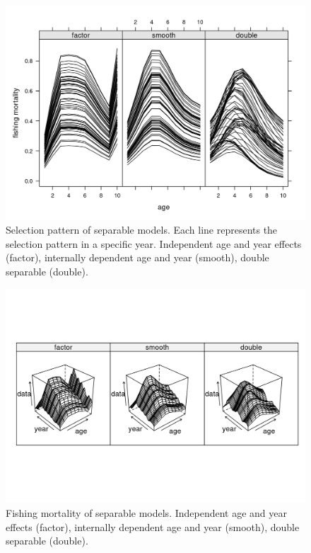 \documentclass[
]{book}
\begin{document}
\begin{figure}
\centering
\includegraphics{_bookdown_files/_main_files/figure-html/sep00-1.png}
\caption{\label{fig:sep00}Selection pattern of separable models. Each line represents the selection pattern in a specific year. Independent age and year effects (factor), internally dependent age and year (smooth), double separable (double).}
\end{figure}

\begin{figure}
\centering
\includegraphics{_bookdown_files/_main_files/figure-html/sep01-1.png}
\caption{\label{fig:sep01}Fishing mortality of separable models. Independent age and year effects (factor), internally dependent age and year (smooth), double separable (double).}
\end{figure}
\end{document}
